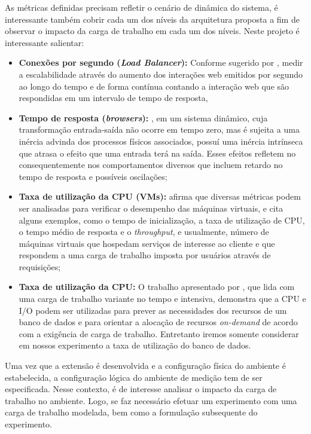 As métricas definidas precisam refletir o cenário de dinâmica do sistema, é interessante também cobrir cada um dos níveis da arquitetura proposta a fim de observar o impacto da carga de trabalho em cada um dos níveis. Neste projeto é interessante salientar:
\begin{itemize}
	\item \textbf{Conexões por segundo (\textit{Load Balancer}):} Conforme sugerido por , medir a escalabilidade através do aumento dos interações web emitidos por segundo ao longo do tempo e de forma contínua contando a interação web que são respondidas em um intervalo de tempo de resposta,
	
	\item \textbf{Tempo de resposta (\textit{browsers}):} , em um sistema dinâmico, cuja transformação entrada-saída não ocorre em tempo zero, mas é sujeita a uma inércia advinda dos processos físicos associados, possuí uma inércia intrínseca que atrasa o efeito que uma entrada terá na saída. Esses efeitos refletem no consequentemente nos comportamentos diversos que incluem retardo no tempo de resposta e possíveis oscilações; 
	
	\item \textbf{Taxa de utilização da CPU (VMs):}  afirma que diversas métricas podem ser analisadas para verificar o desempenho das máquinas virtuais, e cita alguns exemplos, como o tempo de inicialização, a taxa de utilização de CPU, o tempo médio de resposta e o \textit{throughput}, e usualmente, número de máquinas virtuais que hospedam serviços de interesse ao cliente e que respondem a uma carga de trabalho imposta por usuários através de requisições;

	\item \textbf{Taxa de utilização da CPU:} O trabalho apresentado por , que lida com uma carga de trabalho variante no tempo e intensiva, demonstra que a CPU e I/O podem ser utilizadas para prever as necessidades dos recursos de um banco de dados e para orientar a alocação de recursos \textit{on-demand} de acordo com a exigência de carga de trabalho. Entretanto iremos somente considerar em nossos experimento a taxa de utilização do banco de dados.
\end{itemize}

Uma vez que a extensão é desenvolvida e a configuração física do ambiente é estabelecida, a configuração lógica do ambiente de medição tem de ser especificada. Nesse contexto, é de interesse analisar o impacto da carga de trabalho no ambiente. Logo, se faz necessário efetuar um experimento com uma carga de trabalho modelada, bem como a formulação subsequente do experimento. 

